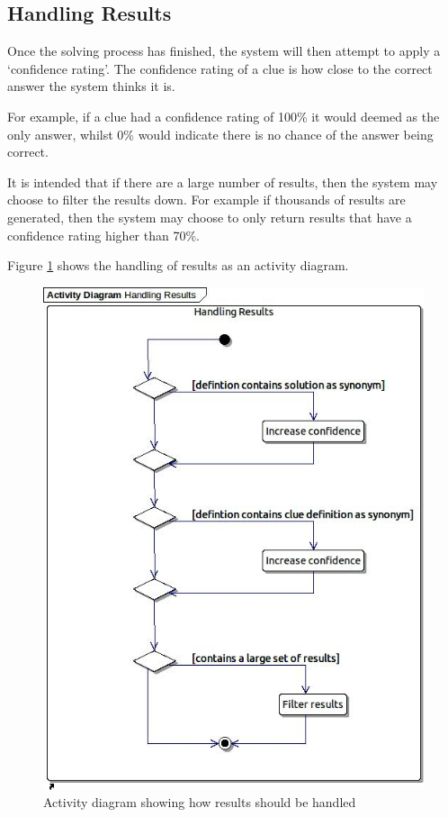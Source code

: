 \subsection{Handling Results} 
\label{sub:results}

Once the solving process has finished, the system will then attempt to apply a 
`confidence rating'. The confidence rating of a clue is how close to the correct
answer the system thinks it is. 

For example, if a clue had a confidence rating of 100\% it would deemed as the 
only answer, whilst 0\% would indicate there is no chance of the answer being 
correct.

It is intended that if there are a large number of results, then the system may
choose to filter the results down. For example if thousands of results are 
generated, then the system may choose to only return results that have a 
confidence rating higher than 70\%.

Figure \ref{fig:results_activity} shows the handling of results as an activity 
diagram.

\begin{figure}[H]
  \centering
  \includegraphics[scale=0.6]{design/activity/handling_results.jpg}
  \caption{Activity diagram showing how results should be handled}
  \label{fig:results_activity}
\end{figure}

